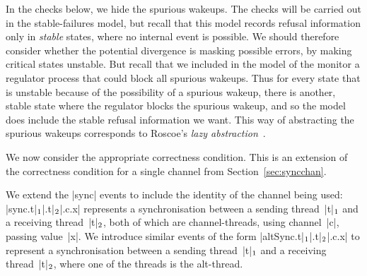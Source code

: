 In the checks below, we hide the spurious wakeups.  The checks will be carried
out in the stable-failures model, but recall that this model records refusal
information only in \emph{stable} states, where no internal event is possible.
We should therefore consider whether the potential divergence is masking
possible errors, by making critical states unstable.  But recall that we
included in the model of the monitor a regulator process that could block all
spurious wakeups.  Thus for every state that is unstable because of the
possibility of a spurious wakeup, there is another, stable state where the
regulator blocks the spurious wakeup, and so the model does include the stable
refusal information we want.  This way of abstracting the spurious wakeups
corresponds to Roscoe's \emph{lazy abstraction}~\cite{awr:UCS}.


We now consider the appropriate correctness condition.   This is an extension
of the correctness condition for a single channel from
Section~\ref{sec:syncchan}. 

We extend the |sync| events to include the identity of the channel being used:
|sync.t|$_1$|.t|$_2$|.c.x| represents a synchronisation between a sending
thread~|t|$_1$ and a receiving thread~|t|$_2$, both of which are
channel-threads, using channel~|c|, passing value~|x|.
%
We introduce similar events of the form
|altSync.t|$_1$|.t|$_2$|.c.x| to represent a
synchronisation between a sending thread~|t|$_1$ and a receiving
thread~|t|$_2$, where one of the threads is the alt-thread.

